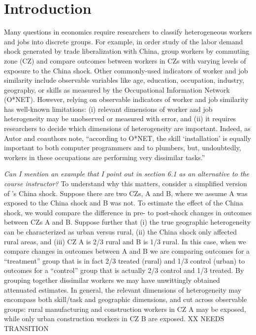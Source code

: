 \documentclass[12pt]{article}
\theoremstyle{definition}
\theoremstyle{plain}
\begin{document}


\clearpage

\onehalfspacing
\section{Introduction}

Many questions in economics require researchers to classify heterogeneous workers and jobs into discrete groups. For example, in order study of the labor demand shock generated by trade liberalization with China, \citet{AutorDornHanson2013} group workers by commuting zone (CZ) and compare outcomes between workers in CZs with varying levels of exposure to the China shock. Other commonly-used indicators of worker and job similarity include observable variables like age, education, occupation, industry, geography, or skills as measured by the Occupational Information Network (O*NET). However, relying on observable indicators of worker and job similarity has well-known limitations: (i) relevant dimensions of worker and job heterogeneity may be unobserved or measured with error, and (ii) it requires researchers to decide which dimensions of heterogeneity are important. Indeed, as Autor and coauthors note, ``according to O*NET, the skill `installation' is equally important to both computer programmers and to plumbers, but, undoubtedly, workers in these occupations are performing very dissimilar tasks.''  \citep{FrankAutorBessenBrynjolfssonCebrianDemingFeldmanGrohLoboMoro2019}

\emph{ Can I mention an example that I point out in section 6.1 as an alternative to the course instructor?}
To understand why this matters, consider a simplified version of \citet{AutorDornHanson2013}'s China shock. Suppose there are two CZs, A and B, where we assume A was exposed to the China shock and B was not. To estimate the effect of the China shock, we would compare the difference in pre- to post-shock changes in outcomes between CZs A and B. Suppose further that (i) the true geographic heterogeneity can be characterized as urban versus rural, (ii) the China shock only affected rural areas, and (iii)  CZ A is 2/3 rural and B is 1/3 rural. In this case, when we compare changes in outcomes between A and B we are comparing outcomes for a ``treatment'' group that is in fact 2/3 treated (rural) and 1/3 control (urban) to outcomes for a ``control'' group that is actually 2/3 control and 1/3 treated. By grouping together dissimilar workers we may have unwittingly obtained attenuated estimates. In general, the relevant dimensions of heterogeneity may encompass both skill/task and geographic dimensions, and cut across observable groups: rural manufacturing and construction workers in CZ A may be exposed, while only urban construction workers in CZ B are exposed. XX NEEDS TRANSITION
\end{document}
